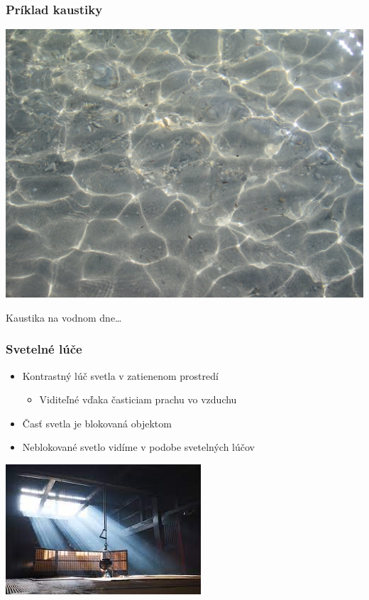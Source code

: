 \documentclass{beamer}
\begin{document}
\begin{frame}[fragile=singleslide]\frametitle{Príklad kaustiky}
\begin{center}
\includegraphics[scale=.20]{Kaustika.jpg}

{\tiny Kaustika na vodnom dne\ldots}
\end{center}
\end{frame}

\begin{frame}[fragile=singleslide]\frametitle{Svetelné lúče}
\begin{itemize}
\item Kontrastný lúč svetla v zatienenom prostredí
	\begin{itemize}
	\item Viditeľné vďaka časticiam prachu vo vzduchu
	\end{itemize}
\item Časť svetla je blokovaná objektom 
\item Neblokované svetlo vidíme v podobe svetelných lúčov
\end{itemize}
\begin{center}
\includegraphics[scale=.5]{Svetelne_luce.jpg}
\end{center}
\end{frame}
\end{document}
